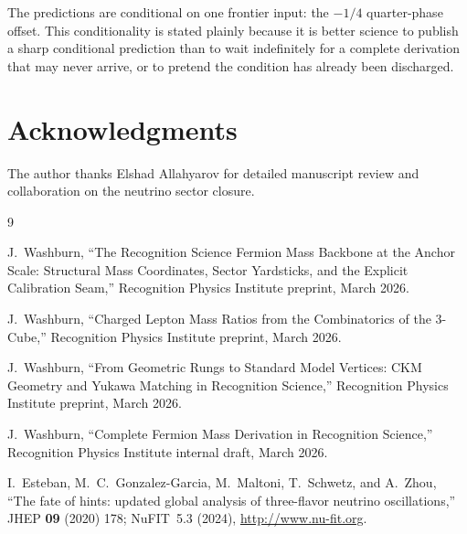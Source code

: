 \documentclass[11pt]{article}
\theoremstyle{remark}
\begin{document}
The predictions are conditional on one frontier input: the
$-1/4$ quarter-phase offset.  This conditionality is stated
plainly because it is better science to publish a sharp
conditional prediction than to wait indefinitely for a complete
derivation that may never arrive, or to pretend the condition
has already been discharged.

\section*{Acknowledgments}

The author thanks Elshad Allahyarov for detailed manuscript
review and collaboration on the neutrino sector closure.

\begin{thebibliography}{9}

J.~Washburn,
``The Recognition Science Fermion Mass Backbone at the Anchor Scale:
Structural Mass Coordinates, Sector Yardsticks, and the Explicit
Calibration Seam,''
Recognition Physics Institute preprint, March 2026.

J.~Washburn,
``Charged Lepton Mass Ratios from the Combinatorics of the 3-Cube,''
Recognition Physics Institute preprint, March 2026.

J.~Washburn,
``From Geometric Rungs to Standard Model Vertices: CKM Geometry and
Yukawa Matching in Recognition Science,''
Recognition Physics Institute preprint, March 2026.

J.~Washburn,
``Complete Fermion Mass Derivation in Recognition Science,''
Recognition Physics Institute internal draft, March 2026.

I.~Esteban, M.~C.~Gonzalez-Garcia, M.~Maltoni, T.~Schwetz, and
A.~Zhou,
``The fate of hints: updated global analysis of three-flavor
neutrino oscillations,''
JHEP \textbf{09} (2020) 178;
NuFIT~5.3 (2024), \url{http://www.nu-fit.org}.

\end{thebibliography}
\end{document}
